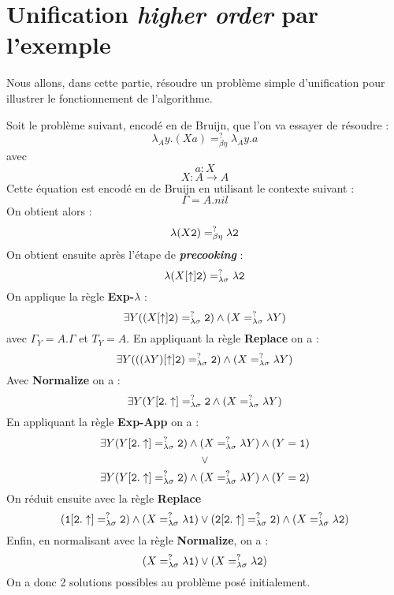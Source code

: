 \section{Unification \textit{higher order} par l'exemple}

Nous allons, dans cette partie, résoudre un problème simple d'unification pour illustrer le fonctionnement de l'algorithme.

Soit le problème suivant, encodé en de Bruijn, que l'on va essayer de résoudre :
\[
\lambda_Ay.(Xa) =^{?}_{\beta\eta} \lambda_Ay.a
\]
avec
\[
a : X
\]
\[
X : A\xrightarrow{}A
\]
Cette équation est encodé en de Bruijn en utilisant le contexte suivant :
\[
\Gamma = A.nil
\]
On obtient alors :
\[
\lambda(X \verb?2?) =^{?}_{\beta\eta} \lambda\verb?2?
\]
On obtient ensuite après l'étape de \textbf{\textit{precooking}} :
\[
\lambda(X[\uparrow]\verb?2?) \eqls \lambda\verb?2?
\]
On applique la règle \textbf{Exp-$\lambda$} :
\[
\exists Y((X[\uparrow]\verb?2?) \eqls \verb?2?) \land (X \eqls \lambda Y)
\]
avec $\Gamma _Y = A.\Gamma$ et $T_Y = A$. En appliquant la règle \textbf{Replace} on a :
\[
\exists Y(((\lambda Y)[\uparrow]\verb?2?) \eqls \verb?2?) \land (X \eqls \lambda Y)
\]
Avec \textbf{Normalize} on a :
\[
\exists Y(Y[\verb?2?.\uparrow] \eqls \verb?2? \land (X \eqls \lambda Y)
\]
En appliquant la règle \textbf{Exp-App} on a :
\[
\exists Y(Y[\verb?2?.\uparrow] \eqls \verb?2?) \land (X \eqls \lambda Y) \land (Y = \verb?1?)
\]
\[
\lor
\]
\[
\exists Y(Y[\verb?2?.\uparrow] \eqls \verb?2?) \land (X \eqls \lambda Y) \land (Y = \verb?2?)
\]
On réduit ensuite avec la règle \textbf{Replace}
\[
(\verb?1?[\verb?2?.\uparrow] \eqls  \verb?2?) \land (X \eqls \lambda \verb?1?) \lor (\verb?2?[\verb?2?.\uparrow] \eqls \verb?2?) \land (X \eqls \lambda\verb?2?)
\]
Enfin, en normalisant avec la règle \textbf{Normalize}, on a :
\[
(X \eqls \lambda\verb?1?) \lor (X \eqls \lambda\verb?2?)
\]
On a donc 2 solutions possibles au problème posé initialement.